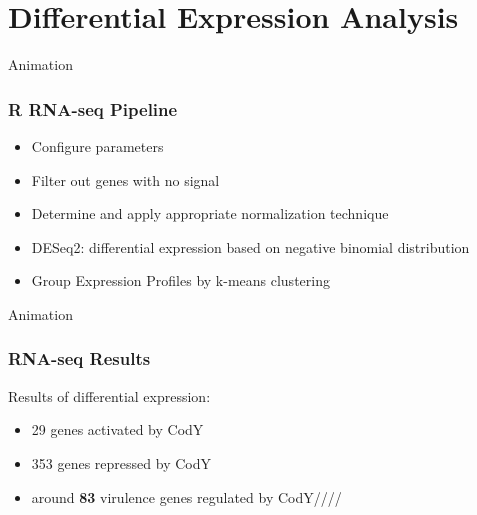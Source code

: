 \documentclass[10pt, compress]{beamer}
\begin{document}
\section{Differential Expression Analysis}
\begin{frame}{Animation}
\frametitle{R RNA-seq Pipeline}
\begin{itemize}[<+- | alert@+>]
	\item Configure parameters
	\item Filter out genes with no signal
	\item Determine and apply appropriate normalization technique
	\item DESeq2: differential expression based on negative binomial distribution
	\item Group Expression Profiles by k-means clustering

\end{itemize}
\end{frame}
\begin{frame}{Animation}
\frametitle{RNA-seq Results}
Results of differential expression:
\begin{itemize}[<+- | alert@+>]
	\item 29 genes activated by CodY
	\item 353 genes repressed by CodY
	\item around \textbf{83} virulence genes regulated by CodY////
\end{itemize}
\end{frame}




\end{document}
